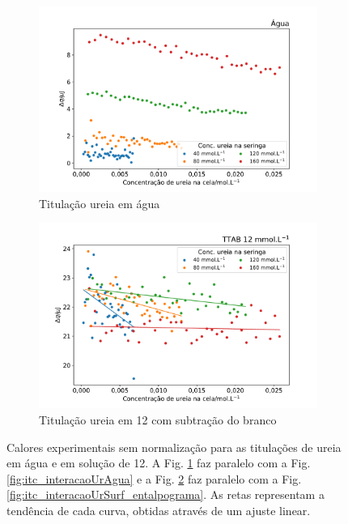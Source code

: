 \begin{figure}[h]
	\begin{subfigure}{0.45\textwidth}
		\centering
		\includegraphics[width=\textwidth]{imagens/itc/interacao_branco_dq}
		\caption{Titulação ureia em água}
		\label{fig:itc_interacaoUreiaAguaDq}
	\end{subfigure} \qquad%
	\begin{subfigure}{0.45\textwidth}
		\centering
		\includegraphics[width=\textwidth]{imagens/itc/interacao_ureia_surf_dq}
		\caption{Titulação ureia em \TTAB{} 12\mM{} com subtração do branco}
		\label{fig:itc_interacaoUreiaSurfDq}
	\end{subfigure}

	\caption{Calores experimentais sem normalização para as titulações de ureia em água e em solução de \TTAB{} 12\mM. A Fig. \ref{fig:itc_interacaoUreiaAguaDq} faz paralelo com a Fig. \ref{fig:itc_interacaoUrAgua} e a Fig. \ref{fig:itc_interacaoUreiaSurfDq} faz paralelo com a Fig. 
	\ref{fig:itc_interacaoUrSurf_entalpograma}. As retas representam a tendência de cada curva, obtidas através de um ajuste linear.}
	\label{fig:itc_comparativo_tit_ureia_agua_ureia_ttab}
\end{figure}
	

